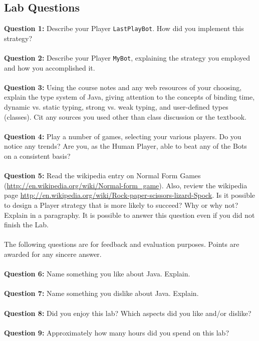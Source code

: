 \documentclass{article}
\begin{document}
\newpage

\begin{tcolorbox}
 \section*{Lab Questions}
 \textbf{Question 1:} Describe your Player \verb|LastPlayBot|. How did you implement this strategy?
 \\\\
 \textbf{Question 2:} Describe your Player \verb|MyBot|, explaining the strategy you employed and how you accomplished it.
 \\\\
 \textbf{Question 3:} Using the course notes and any web resources of your choosing, explain the type system of Java, giving attention to the concepts of binding time, dynamic vs. static typing, strong vs. weak typing, and user-defined types (classes). Cit any sources you used other than class discussion or the textbook.
 \\\\
 \textbf{Question 4:} Play a number of games, selecting your various players. Do you notice any trends? Are you, as the Human Player, able to beat any of the Bots on a consistent basis?
 \\\\
 \textbf{Question 5:} Read the wikipedia entry on Normal Form Games (\url{http://en.wikipedia.org/wiki/Normal-form\_game}). Also, review the wikipedia page \url{http://en.wikipedia.org/wiki/Rock-paper-scissors-lizard-Spock}. Is it possible to design a Player strategy that is more likely to succeed? Why or why not? Explain in a paragraphy. It is possible to answer this question even if you did not finish the Lab.
 \\\\
 The following questions are for feedback and evaluation purposes. Points are awarded for any sincere answer.
 \\\\
 \textbf{Question 6:} Name something you like about Java. Explain.
 \\\\
 \textbf{Question 7:} Name something you dislike about Java. Explain.
 \\\\
 \textbf{Question 8:} Did you enjoy this lab? Which aspects did you like and/or dislike?
 \\\\
 \textbf{Question 9:} Approximately how many hours did you spend on this lab?
\end{tcolorbox}
\end{document}
